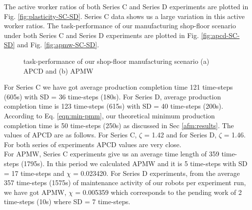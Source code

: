 %
The active worker ratios of both Series C and Series D experiments are plotted in Fig. \ref{fig:plasticity-SC-SD}. Series C data shows us a large variation in this active worker ratios.
The task-performance of our manufacturing shop-floor scenario under both Series C and Series D experiments are plotted in Fig. \ref{fig:apcd-SC-SD} and Fig. \ref{fig:apmw-SC-SD}. 
\begin{figure}
\centering
{}
\caption{\small task-performance of our shop-floor manufacturing scenario (a) APCD and (b) APMW} 
\end{figure}
For Series C we have got average production completion time 121 time-steps (605s) with SD = 36 time-steps (180s). For Series D,  average production completion time is 123 time-steps (615s) with SD = 40 time-steps (200s). According to Eq. \ref{eqn:min-pmm}, our theoretical minimum production completion time is 50 time-steps (250s) as discussed in Sec \ref{afm:results}.  The values of APCD are as follows. For Series C, $\zeta$ = 1.42 and for Series D, $\zeta$ = 1.46. For both series of experiments APCD values are very close.\\
For APMW, Series C experiments give us an average time length of 359 time-steps (1795s). In this period we calculated APMW and it is 5 time-steps with SD = 17 time-steps and $\chi$ = 0.023420. For Series D experiments, from the average 357 time-steps (1575s) of maintenance activity of our robots per experiment run, we have got APMW, $\chi$ = 0.005359 which corresponds to the pending work of 2 time-steps (10s) where SD = 7 time-steps.
